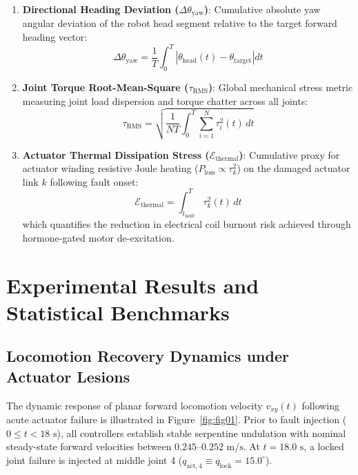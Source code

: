 \documentclass{iopjournal}
\begin{document}
\begin{enumerate}
\begin{equation}
E_{\text{total}} = \int_0^T \sum_{i=1}^N \left| \tau_i(t)\, \dot{q}_i(t) \right| dt
\end{equation}
\item \textbf{Directional Heading Deviation ($\Delta\theta_{\text{yaw}}$)}: Cumulative absolute yaw angular deviation of the robot head segment relative to the target forward heading vector:
\begin{equation}
\Delta\theta_{\text{yaw}} = \frac{1}{T} \int_0^T \left| \theta_{\text{head}}(t) - \theta_{\text{target}} \right| dt
\end{equation}
\item \textbf{Joint Torque Root-Mean-Square ($\tau_{\text{RMS}}$)}: Global mechanical stress metric measuring joint load dispersion and torque chatter across all joints:
\begin{equation}
\tau_{\text{RMS}} = \sqrt{\frac{1}{N T} \int_0^T \sum_{i=1}^N \tau_i^2(t)\, dt}
\end{equation}
\item \textbf{Actuator Thermal Dissipation Stress ($\mathcal{E}_{\text{thermal}}$)}: Cumulative proxy for actuator winding resistive Joule heating ($P_{\text{loss}} \propto \tau_k^2$) on the damaged actuator link $k$ following fault onset:
\begin{equation}
\mathcal{E}_{\text{thermal}} = \int_{t_{\text{fault}}}^T \tau_k^2(t)\, dt
\end{equation}
which quantifies the reduction in electrical coil burnout risk achieved through hormone-gated motor de-excitation.
\end{enumerate}

\section{Experimental Results and Statistical Benchmarks}
\label{sec:results}

\subsection{Locomotion Recovery Dynamics under Actuator Lesions}

The dynamic response of planar forward locomotion velocity $v_{xy}(t)$ following acute actuator failure is illustrated in Figure~\ref{fig:fig01}. Prior to fault injection ($0 \le t < 18\text{ s}$), all controllers establish stable serpentine undulation with nominal steady-state forward velocities between $0.245\text{--}0.252\text{ m/s}$. At $t = 18.0\text{ s}$, a locked joint failure is injected at middle joint 4 ($q_{\text{act},4} \equiv q_{\text{lock}} = 15.0^\circ$).
\end{document}
